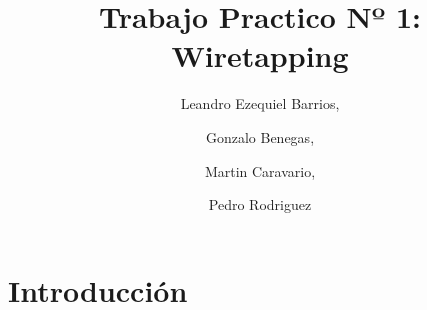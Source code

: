 \documentclass[final,narroweqnarray,inline]{ieee}
\begin{document}
\title[Trabajo Practico Nº 1: Wiretapping]{%
       Trabajo Practico Nº 1: Wiretapping}

\author[SHORT NAMES]{%
      Leandro Ezequiel Barrios,
    \and
      Gonzalo Benegas,
    \and
     Martin Caravario, 
    \and
     Pedro Rodriguez 
  }





\maketitle               




\section{Introducción}
\end{document}
